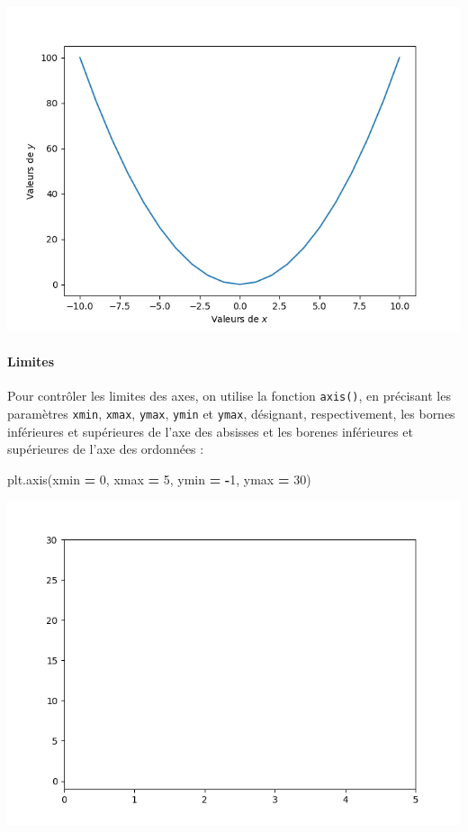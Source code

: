 \documentclass[12pt,]{book}
\newenvironment{Shaded}{\begin{snugshade}}{\end{snugshade}}
\newcommand{\DecValTok}[1]{\textcolor[rgb]{0.00,0.00,0.81}{#1}}
\newcommand{\OperatorTok}[1]{\textcolor[rgb]{0.81,0.36,0.00}{\textbf{#1}}}
\newcommand{\NormalTok}[1]{#1}
\let\oldparagraph\paragraph
\renewcommand{\paragraph}[1]{\oldparagraph{#1}\mbox{}}
\numberwithin{equation}{section}
\numberwithin{countremarque}{section}
\begin{document}
\begin{center}\includegraphics[width=9.03in]{figs/pyplot/plot_axes_label} \end{center}

\paragraph{Limites}\label{limites}

Pour contrôler les limites des axes, on utilise la fonction
\texttt{axis()}, en précisant les paramètres \texttt{xmin},
\texttt{xmax}, \texttt{ymax}, \texttt{ymin} et \texttt{ymax}, désignant,
respectivement, les bornes inférieures et supérieures de l'axe des
absisses et les borenes inférieures et supérieures de l'axe des
ordonnées :

\begin{Shaded}
\begin{Highlighting}[]
\NormalTok{plt.axis(xmin }\OperatorTok{=} \DecValTok{0}\NormalTok{, xmax }\OperatorTok{=} \DecValTok{5}\NormalTok{, ymin }\OperatorTok{=} \OperatorTok{-}\DecValTok{1}\NormalTok{, ymax }\OperatorTok{=} \DecValTok{30}\NormalTok{)}
\end{Highlighting}
\end{Shaded}

\begin{center}\includegraphics[width=9.03in]{figs/pyplot/plot_axes_limites} \end{center}
\end{document}
